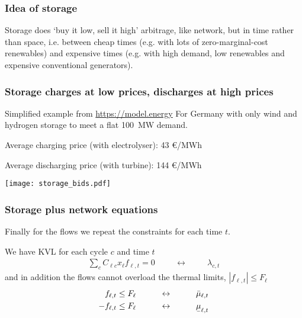 \documentclass[10pt,aspectratio=169,dvipsnames]{beamer}
\def\l{\lambda}
\def\m{\mu}
\newcommand{\ubar}[1]{\text{\b{$#1$}}}
\begin{document}
\begin{frame}[fragile]
  \frametitle{Idea of storage}


  Storage does `buy it low, sell it high' \alert{arbitrage}, like network, but
  in time rather than space, i.e. between cheap times (e.g. with lots
  of zero-marginal-cost renewables) and expensive times (e.g. with
  high demand, low renewables and expensive conventional generators).



\end{frame}



\begin{frame}[fragile]
  \frametitle{Storage charges at low prices, discharges at high prices}

  Simplified example from \url{https://model.energy} For Germany with only wind and hydrogen storage to meet a flat 100~MW demand.

  Average charging price (with electrolyser): 43 \euro/MWh

  Average discharging price (with turbine): 144 \euro/MWh

    \centering \texttt{[image: storage\_bids.pdf]}



\end{frame}



\begin{frame}[fragile]
  \frametitle{Storage plus network equations}



  Finally for the flows we repeat the constraints for each time $t$.

  We have KVL for each cycle $c$ and time $t$
  \begin{align*}
    \sum_{c} C_{\ell c} x_\ell f_{\ell,t} = 0  \hspace{1cm}\leftrightarrow\hspace{1cm} \l_{c,t}
  \end{align*}
  and in addition the flows cannot overload the thermal limits, $|f_{\ell,t}| \leq F_\ell$
  \begin{align*}
    f_{\ell,t} \leq F_\ell  \hspace{1cm}\leftrightarrow\hspace{1cm} \bar{\m}_{\ell,t} \\
        - f_{\ell,t} \leq  F_\ell  \hspace{1cm}\leftrightarrow\hspace{1cm} \ubar{\m}_{\ell,t}
  \end{align*}

\end{frame}
\end{document}
